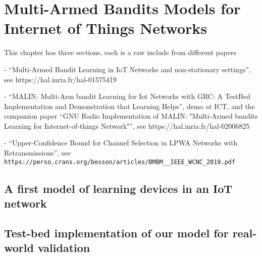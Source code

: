 
\chapter{Multi-Armed Bandits Models for Internet of Things Networks}
\label{chapter:4}
\minitoc
\newpage
\graphicspath{{2-Chapters/4-Chapter/Images/}}




This chapter has three sections, each is a raw include from different papers

- ``Multi-Armed Bandit Learning in IoT Networks and non-stationary settings'', see https://hal.inria.fr/hal-01575419

- ``MALIN: Multi-Arm bandit Learning for Iot Networks with GRC: A TestBed Implementation and Demonstration that Learning Helps'', demo at ICT, and the companion paper ``GNU Radio Implementation of MALIN: "Multi-Armed bandits Learning for Internet-of-things Network"'', see https://hal.inria.fr/hal-02006825

- ``Upper-Confidence Bound for Channel Selection in LPWA Networks with Retransmissions'', see \texttt{https://perso.crans.org/besson/articles/BMBM\_\_IEEE\_WCNC\_2019.pdf}


\section{A first model of learning devices in an IoT network}
\label{sec:4:firstModel}





\section{Test-bed implementation of our model for real-world validation}
\label{sec:4:gnuradio}

